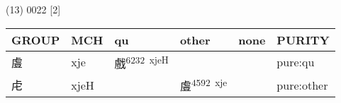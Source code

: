 \documentclass[14pt,a4paper]{scrartcl}
\begin{document}
(13) 0022 {[}2{]}

\begin{longtable}[c]{@{}llllll@{}}
\toprule
\begin{minipage}[b]{0.14\columnwidth}\raggedright\strut
GROUP
\strut\end{minipage} &
\begin{minipage}[b]{0.14\columnwidth}\raggedright\strut
MCH
\strut\end{minipage} &
\begin{minipage}[b]{0.14\columnwidth}\raggedright\strut
qu
\strut\end{minipage} &
\begin{minipage}[b]{0.14\columnwidth}\raggedright\strut
other
\strut\end{minipage} &
\begin{minipage}[b]{0.14\columnwidth}\raggedright\strut
none
\strut\end{minipage} &
\begin{minipage}[b]{0.14\columnwidth}\raggedright\strut
PURITY
\strut\end{minipage}\tabularnewline
\midrule
\endhead
\begin{minipage}[t]{0.14\columnwidth}\raggedright\strut
䖒
\strut\end{minipage} &
\begin{minipage}[t]{0.14\columnwidth}\raggedright\strut
xje
\strut\end{minipage} &
\begin{minipage}[t]{0.14\columnwidth}\raggedright\strut
戲\textsuperscript{6232~xjeH}
\strut\end{minipage} &
\begin{minipage}[t]{0.14\columnwidth}\raggedright\strut
\strut\end{minipage} &
\begin{minipage}[t]{0.14\columnwidth}\raggedright\strut
\strut\end{minipage} &
\begin{minipage}[t]{0.14\columnwidth}\raggedright\strut
pure:qu
\strut\end{minipage}\tabularnewline
\begin{minipage}[t]{0.14\columnwidth}\raggedright\strut
虍
\strut\end{minipage} &
\begin{minipage}[t]{0.14\columnwidth}\raggedright\strut
xjeH
\strut\end{minipage} &
\begin{minipage}[t]{0.14\columnwidth}\raggedright\strut
\strut\end{minipage} &
\begin{minipage}[t]{0.14\columnwidth}\raggedright\strut
䖒\textsuperscript{4592~xje}
\strut\end{minipage} &
\begin{minipage}[t]{0.14\columnwidth}\raggedright\strut
\strut\end{minipage} &
\begin{minipage}[t]{0.14\columnwidth}\raggedright\strut
pure:other
\strut\end{minipage}\tabularnewline
\bottomrule
\end{longtable}
\end{document}
